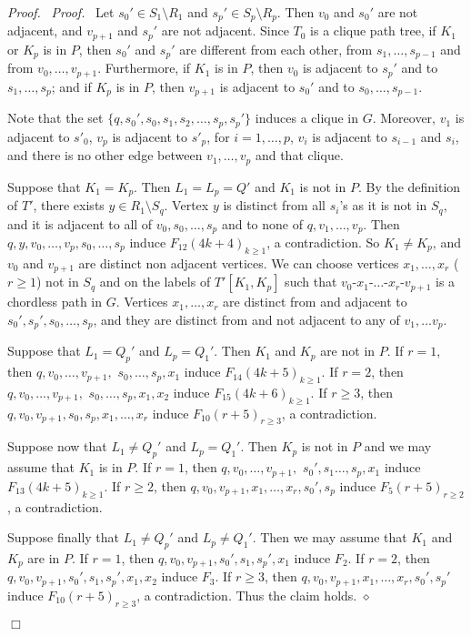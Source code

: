 \documentclass[11pt]{article}
\newenvironment{proof}{\noindent \emph{Proof.}\ }{\hfill
    $\Box$\vspace{1em}}
\newenvironment{proofcl}{\noindent \emph{Proof.}\ }{Thus the claim
holds.  \hfill $\diamond$\vspace{1em}}
\begin{document}
\begin{proof}
\begin{proofcl}
Let $s_0' \in S_1\setminus R_1$ and $s_p' \in S_p\setminus R_p$.  Then
$v_0$ and $s_0'$ are not adjacent, and $v_{p+1}$ and $s_p'$ are not
adjacent.  Since $T_0$ is a clique path tree, if $K_1$ or $K_p$ is in
$P$, then $s_0'$ and $s_p'$ are different from each other, from $s_1,
\ldots, s_{p-1}$ and from $v_0, \ldots, v_{p+1}$.  Furthermore, if
$K_1$ is in $P$, then $v_0$ is adjacent to $s_p'$ and to $s_1, \ldots,
s_p$; and if $K_p$ is in $P$, then $v_{p+1}$ is adjacent to $s_0'$ and
to $s_0, \ldots, s_{p-1}$.

Note that the set $\{q, s_0', s_0, s_1, s_2, \ldots, s_p, s_p'\}$
induces a clique in $G$.  Moreover, $v_1$ is adjacent to $s'_0$, $v_p$
is adjacent to $s'_p$, for $i= 1, \ldots, p$, $v_{i}$ is adjacent to
$s_{i-1}$ and $s_{i}$, and there is no other edge between $v_1,
\ldots, v_p$ and that clique.

Suppose that $K_1=K_p$.  Then $L_1= L_p=Q'$ and $K_1$ is not in $P$.
By the definition of $T'$, there exists $y\in R_1\setminus S_q$.
Vertex $y$ is distinct from all $s_i$'s as it is not in $S_q$, and it
is adjacent to all of $v_0, s_0, \ldots, s_p$ and to none of $q, v_1,
\ldots, v_p$.  Then $q, y, v_0, \ldots, v_p, s_0, \ldots , s_p$ induce
$F_{12}(4k+4)_{k\geq1}$, a contradiction.  So $K_1\neq K_p$, and $v_0$
and $v_{p+1}$ are distinct non adjacent vertices.  We can choose
vertices $x_1, \ldots, x_r$ ($r\geq 1$) not in $S_q$ and on the labels
of $T'[K_1, K_p]$ such that $v_0$-$x_1$-$\ldots$-$x_r$-$v_{p+1}$ is a
chordless path in $G$.  Vertices $x_1, \ldots, x_r$ are distinct from
and adjacent to $s_0', s_p', s_0, \ldots, s_p$, and they are distinct
from and not adjacent to any of $v_1, \ldots v_p$.

Suppose that $L_1 = Q_p'$ and $L_p = Q_1'$.  Then $K_1$ and $K_p$ are
not in $P$.  If $r=1$, then $q, v_0, \ldots, v_{p+1},$ $s_0, \ldots,
s_p, x_1$ induce $F_{14}(4k+5)_{k\geq1}$.  If $r=2$, then $q, v_0,
\ldots, v_{p+1},$ $s_0, \ldots, s_p, x_1, x_2$ induce
$F_{15}(4k+6)_{k\geq1}$.  If $r\geq 3$, then $q, v_0, v_{p+1}, s_0,
s_p, x_1, \ldots, x_r$ induce $F_{10}(r+5)_{r\geq3}$, a contradiction.

Suppose now that $L_1 \neq Q_p'$ and $L_p = Q_1'$.  Then $K_p$ is not
in $P$ and we may assume that $K_1$ is in $P$.  If $r=1$, then $q,
v_0, \ldots, v_{p+1},$ $s_0', s_1 \ldots, s_p, x_1$ induce
$F_{13}(4k+5)_{k\geq1}$.  If $r\geq 2$, then $q, v_0, v_{p+1}, x_1,
\ldots, x_r, s_0', s_p$ induce $F_{5}(r+5)_{r\geq2}$, a contradiction.

Suppose finally that $L_1 \neq Q_p'$ and $L_p \neq Q_1'$.  Then we may
assume that $K_1$ and $K_p$ are in $P$.  If $r=1$, then $q, v_0,
v_{p+1}, s_0', s_1, s_p', x_1$ induce $F_2$.  If $r=2$, then $q, v_0,
v_{p+1}, s_0', s_1, s_p', x_1, x_2$ induce $F_3$.  If $r\geq 3$, then
$q, v_0, v_{p+1}, x_1, \ldots, x_r, s_0', s_p'$ induce
$F_{10}(r+5)_{r\geq3}$, a contradiction.
\end{proofcl}



\end{proof}
\end{document}
